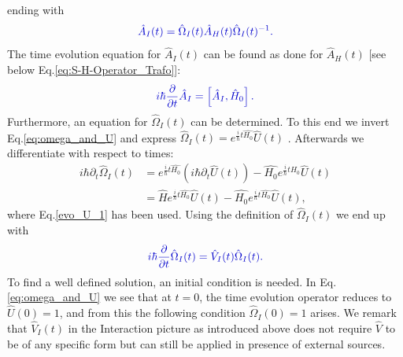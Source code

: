 \documentclass[12pt, titlepage]{article}
\begin{document}
ending with
\begin{equation}\label{eq:operator_interac_heisenberg}
\textcolor[RGB]{0,0,204}{
	\hat{A}_{I}(t)
	=
	\hat{\Omega}_{I}(t)
	\hat{A}_{H}(t)
	\hat{\Omega}_{I}(t)^{-1}
	.
}
\end{equation}
The time evolution equation for $ 	\hat{A}_{I}(t) $ can be found as done for $ \hat{A}_{H}(t) $ $ [ $see below Eq.\enskip\eqref{eq:S-H-Operator_Trafo}]:
\begin{equation}\label{eq:time_evo_equ_Intera}
\textcolor[RGB]{0,0,204}{
	i\hbar
	\frac{\partial}{\partial t}
	\hat{A}_{I}
	=
	\left[ 
	\hat{A}_{I},
	\hat{H}_{0}
	\right] .
}
\end{equation}
Furthermore, an equation for $ \hat{\Omega}_{I}(t) $ can be determined. To this end we invert Eq.\enskip\eqref{eq:omega_and_U} and express $  \hat{\Omega}_{I}(t) 
  		= e^{\frac{i}{\hbar}t \hat{H_{0}}}
			\hat{U}(t)  $ . Afterwards we differentiate with respect to times: 
\begin{subequations}
\begin{align}
  		i\hbar\partial_{t}\hat{\Omega}_{I}(t) 
  		 &= 
  		 e^{\frac{i}{\hbar}t\hat{H_{0}}}
  		 \left(i\hbar\partial_{t}\hat{U}(t) \right)
  		 -
  		 \hat{H_{0}}
   		 e^{\frac{i}{\hbar}t\hat{H_{0}}}
 		 \hat{U}(t)
  		 \\
  		 &=
  		 \hat{H}
  		  e^{\frac{i}{\hbar}t\hat{H_{0}}}  		 
  		 \hat{U}(t)  		 
  		 -
  		 \hat{H_{0}}
  		   e^{\frac{i}{\hbar}t\hat{H_{0}}}
  		 \hat{U}(t),
\end{align}
\end{subequations}
where Eq.\enskip\eqref{evo_U_1} has been used. Using the definition of $ \hat{\Omega}_{I}(t) $ we end up with
\begin{equation}\label{eq:time_evo_Omega_interaction}
\textcolor[RGB]{0,0,204}{
	i\hbar
	\frac{\partial}{\partial t}
	\hat{\Omega}_{I}(t)
	=
	\hat{V}_{I}(t)
	\hat{\Omega}_{I}(t)
.}
\end{equation}
To find a well defined solution, an initial condition is needed. In Eq.\enskip\eqref{eq:omega_and_U} we see that at $ t=0 $, the time evolution operator reduces to $ \hat{U}(0)=1 $, and from this the following condition $ \hat{\Omega}_{I}(0) = 1 $ arises.
We remark that $ \hat{V}_{I}(t) $ in the Interaction picture as introduced above does not require $ \hat{V} $ to be of any specific form but can still be applied in presence of external sources. 
\end{document}
